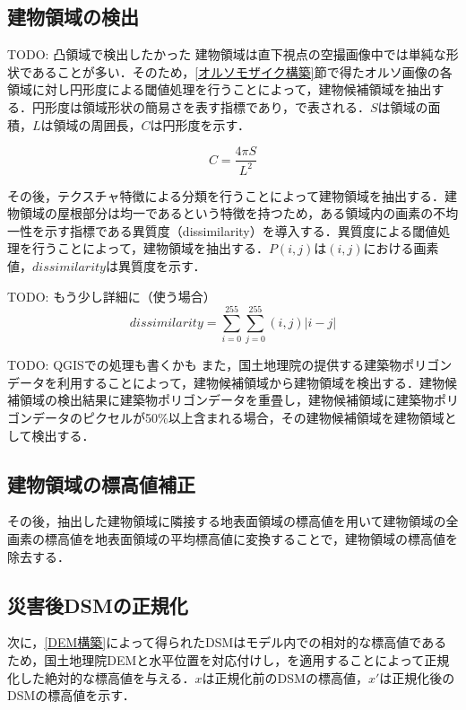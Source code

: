     \subsection{建物領域の検出}
      \label{建物領域の検出}
      TODO: 凸領域で検出したかった
      建物領域は直下視点の空撮画像中では単純な形状であることが多い．そのため，\ref{オルソモザイク構築}節で得たオルソ画像の各領域に対し円形度による閾値処理を行うことによって，建物候補領域を抽出する．円形度は領域形状の簡易さを表す指標であり，で表される．$S$は領域の面積，$L$は領域の周囲長，$C$は円形度を示す．

      \begin{equation}
        \label{円形度}
        C = \dfrac{4 \pi S} {L^2} 
      \end{equation}

      その後，テクスチャ特徴による分類を行うことによって建物領域を抽出する．建物領域の屋根部分は均一であるという特徴を持つため，ある領域内の画素の不均一性を示す指標である異質度（dissimilarity）\cite{論文手法3}を導入する．異質度による閾値処理を行うことによって，建物領域を抽出する．$P(i,j)$は$(i,j)$における画素値，$dissimilarity$は異質度を示す．

      TODO: もう少し詳細に（使う場合）
      \begin{equation}
        \label{異質度}
        dissimilarity = \sum_{i=0}^{255} \sum_{j=0}^{255} (i,j) |i-j|
      \end{equation}

      TODO: QGISでの処理も書くかも
      また，国土地理院の提供する建築物ポリゴンデータ\cite{}を利用することによって，建物候補領域から建物領域を検出する．建物候補領域の検出結果に建築物ポリゴンデータを重畳し，建物候補領域に建築物ポリゴンデータのピクセルが50\%以上含まれる場合，その建物候補領域を建物領域として検出する．

    \subsection{建物領域の標高値補正}
      その後，抽出した建物領域に隣接する地表面領域の標高値を用いて建物領域の全画素の標高値を地表面領域の平均標高値に変換することで，建物領域の標高値を除去する．

    \subsection{災害後DSMの正規化}
      次に，\ref{DEM構築}によって得られたDSMはモデル内での相対的な標高値であるため，国土地理院DEMと水平位置を対応付けし，を適用することによって正規化した絶対的な標高値を与える．$x$は正規化前のDSMの標高値，$x'$は正規化後のDSMの標高値を示す．

